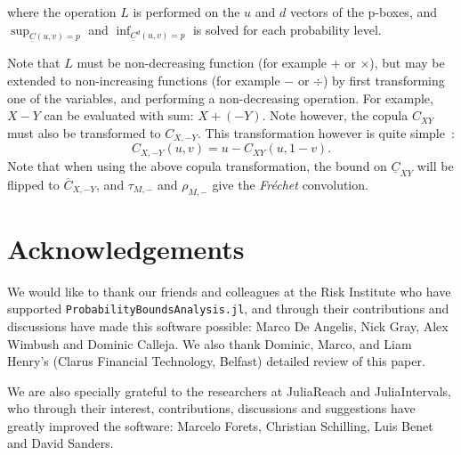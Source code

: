 \documentclass{juliacon}
\begin{document}
where the operation $L$ is performed on the $u$ and $d$ vectors of the p-boxes, and $\sup_{\underline{C}(u,v) = p}$ and $\inf_{\underline{C}^{d}(u,v) = p}$ is solved for each probability level.

Note that $L$ must be non-decreasing function (for example $+$ or $\times$), but may be extended to non-increasing functions (for example $-$ or $\div$) by first transforming one of the variables, and performing a non-decreasing operation. For example, $X - Y$ can be evaluated with sum: $X + (-Y)$. Note however, the copula $C_{XY}$ must also be transformed to $C_{X,-Y}$. This transformation however is quite simple~\cite{nelsen2007introduction}: 
\begin{equation*}\label{rotation}
  C_{X, -Y}(u,v) = u - C_{XY}(u, 1 - v).
\end{equation*}
Note that when using the above copula transformation, the bound on $\underline{C}_{XY}$ will be flipped to $\overline{C}_{X, -Y}$, and $\tau_{M, -}$ and $\rho_{M,-}$ give the \textit{Fréchet} convolution.
\fi

\section*{Acknowledgements}
We would like to thank our friends and colleagues at the Risk Institute who have supported \texttt{ProbabilityBoundsAnalysis.jl}, and through their contributions and discussions have made this software possible: Marco De Angelis, Nick Gray, Alex Wimbush and Dominic Calleja. We also thank Dominic, Marco, and Liam Henry's (Clarus Financial Technology, Belfast) detailed review of this paper.

We are also specially grateful to the researchers at JuliaReach and JuliaIntervals, who through their interest, contributions, discussions and suggestions have greatly improved the software: Marcelo Forets, Christian Schilling, Luis Benet and David Sanders.
\end{document}
